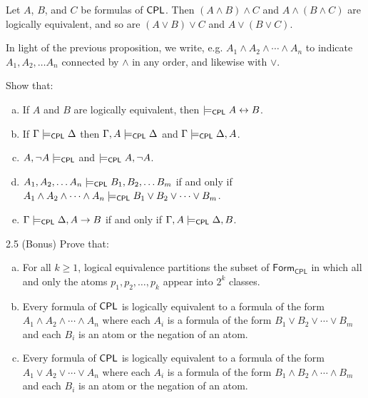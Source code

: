 \documentclass{article}
\begin{document}
\begin{proposition}
    Let $A$, $B$, and $C$ be formulas of $\mathsf{CPL}$. Then $(A \wedge B) \wedge C$ and $A \wedge (B \wedge C)$ are logically equivalent, and so are $(A \vee B) \vee C$ and $A \vee (B \vee C)$.
\end{proposition}

\begin{notation}
    In light of the previous proposition, we write, e.g. $A_1 \wedge A_2 \wedge \cdots \wedge A_n$ to indicate $A_1, A_2, \dots A_n$ connected by $\wedge$ in any order, and likewise with $\vee$. 
\end{notation}

\begin{prob}{2.4}
    Show that:
    \begin{enumerate}[a)]
    \item If $A$ and $B$ are logically equivalent, then $\models_{\mathsf{CPL}} A \leftrightarrow B$.
    \item If $\Gamma \models_{\mathsf{CPL}} \Delta$ then $\Gamma, A \models_{\mathsf{CPL}} \Delta$ and $\Gamma \models_{\mathsf{CPL}} \Delta, A$.
    \item $A, \neg A \models_{\mathsf{CPL}}$ and $\models_{\mathsf{CPL}} A, \neg A$.
    \item $A_1, A_2, \dots A_n \models_{\mathsf{CPL}} B_1, B_2, \dots B_m$ if and only if $A_1 \wedge A_2 \wedge \cdots \wedge A_n \models_{\mathsf{CPL}} B_1 \vee B_2 \vee \cdots \vee B_m$.
    \item $\Gamma \models_{\mathsf{CPL}} \Delta, A \to B$ if and only if $\Gamma, A \models_{\mathsf{CPL}} \Delta, B$.
    \end{enumerate}
\end{prob}

\begin{prob}{2.5 (Bonus)}
    Prove that:
    \begin{enumerate}[a)]
    \item For all $k \geq 1$, logical equivalence partitions the subset of $\mathsf{Form_{CPL}}$ in which all and only the atoms $p_1, p_2, \dots, p_k$ appear into $2^k$ classes.
    \item Every formula of $\mathsf{CPL}$ is logically equivalent to a formula of the form $A_1 \wedge A_2 \wedge \cdots \wedge A_n$ where each $A_i$ is a formula of the form $B_1 \vee B_2 \vee \cdots \vee B_m$ and each $B_i$ is an atom or the negation of an atom.
    \item Every formula of $\mathsf{CPL}$ is logically equivalent to a formula of the form $A_1 \vee A_2 \vee \cdots \vee A_n$ where each $A_i$ is a formula of the form $B_1 \wedge B_2 \wedge \cdots \wedge B_m$ and each $B_i$ is an atom or the negation of an atom.
    \end{enumerate}
\end{prob}
\end{document}
